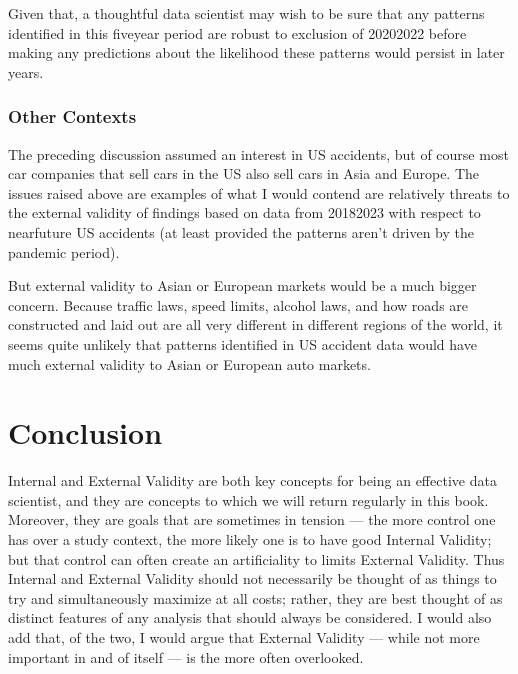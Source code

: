 \documentclass[letterpaper,10pt,english]{jupyterBook}
\begin{document}
\sphinxAtStartPar
Given that, a thoughtful data scientist may wish to be sure that any patterns identified in this five\sphinxhyphen{}year period are robust to exclusion of 2020\sphinxhyphen{}2022 before making any predictions about the likelihood these patterns would persist in later years.


\subsubsection{Other Contexts}
\label{\detokenize{30_questions/15_answering_exploratory_questions:other-contexts}}
\sphinxAtStartPar
The preceding discussion assumed an interest in US accidents, but of course most car companies that sell cars in the US also sell cars in Asia and Europe. The issues raised above are examples of what I would contend are relatively  threats to the external validity of findings based on data from 2018\sphinxhyphen{}2023 with respect to near\sphinxhyphen{}future US accidents (at least provided the patterns aren’t driven by the pandemic period).

\sphinxAtStartPar
But external validity to Asian or European markets would be a much bigger concern. Because traffic laws, speed limits, alcohol laws, and how roads are constructed and laid out are all very different in different regions of the world, it seems quite unlikely that patterns identified in US accident data would have much external validity to Asian or European auto markets.


\section{Conclusion}
\label{\detokenize{30_questions/15_answering_exploratory_questions:conclusion}}
\sphinxAtStartPar
Internal and External Validity are both key concepts for being an effective data scientist, and they are concepts to which we will return regularly in this book. Moreover, they are goals that are sometimes in tension — the more control one has over a study context, the more likely one is to have good Internal Validity; but that control can often create an artificiality to limits External Validity. Thus Internal and External Validity should not necessarily be thought of as things to try and simultaneously maximize at all costs; rather, they are best thought of as distinct features of any analysis that should always be considered. I would also add that, of the two, I would argue that External Validity — while not more important in and of itself — is the more often overlooked.
\end{document}

